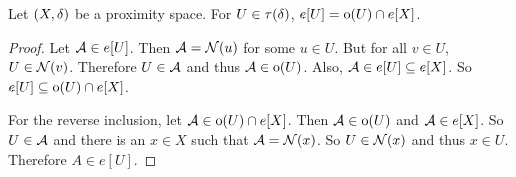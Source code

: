 \begin{lemma}
	\label{eequaloe}
	Let \( (X,\mathord{\delta}) \) be a proximity space. For \( U \in \tau(\mathord{\delta}) \), \( e[U] = \operatorname{o}(U) \cap e[X] \).
\end{lemma}
\begin{proof}
	Let \( \mathcal{A} \in e[U] \).  Then \( \mathcal{A} = \mathcal{N}(u) \) for some \( u \in U \).  But for all \( v \in U \), \( U \in \mathcal{N}(v) \).  Therefore \( U \in \mathcal{A} \) and thus \( \mathcal{A} \in \operatorname{o}(U) \).  Also, \( \mathcal{A} \in e[U] \subseteq e[X] \).  So \( e[U] \subseteq \operatorname{o}(U) \cap e[X] \).
	
	For the reverse inclusion, let \( \mathcal{A} \in \operatorname{o}(U) \cap e[X] \).  Then \( \mathcal{A} \in \operatorname{o}(U) \) and \( \mathcal{A} \in e[X] \).  So \( U \in \mathcal{A} \) and there is an \( x \in X \) such that \( \mathcal{A} = \mathcal{N}(x) \).  So \( U \in \mathcal{N}(x) \) and thus \( x \in U \).  Therefore \( A \in e[U] \).
\end{proof}

